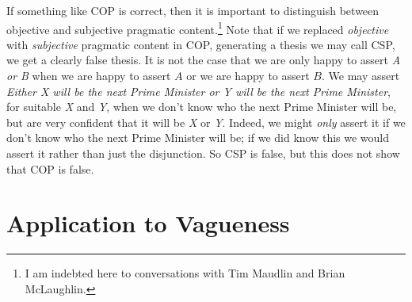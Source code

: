 If something like COP is correct, then it is important to distinguish between objective and subjective pragmatic content.\footnote{I am indebted here to conversations with Tim Maudlin and Brian McLaughlin.} Note that if we replaced \textit{objective} with \textit{subjective} pragmatic content in COP, generating a thesis we may call CSP, we get a clearly false thesis. It is not the case that we are only happy to assert \textit{A or B} when we are happy to assert \(A\) or we are happy to assert \(B\). We may assert \textit{Either X will be the next Prime Minister or Y will be the next Prime Minister}, for suitable \textit{X} and \textit{Y}, when we don't know who the next Prime Minister will be, but are very confident that it will be \textit{X} or \textit{Y}. Indeed, we might \textit{only} assert it if we don't know who the next Prime Minister will be; if we did know this we would assert it rather than just the disjunction. So CSP is false, but this does not show that COP is false.

\section{Application to Vagueness}

